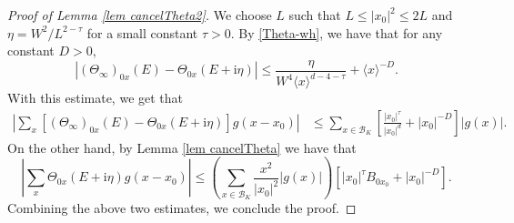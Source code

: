 \documentclass{article}
\newcommand{\1}{\mathds{1}}
\numberwithin{equation}{section}
\newcommand{\be}{\begin{equation}}
\newcommand{\ee}{\end{equation}}
\renewcommand{\cal}{\mathcal}
\newcommand{\ii}{\mathrm{i}} %
\renewcommand{\leq}{\leqslant}
\renewcommand{\le}{\leq}
\theoremstyle{plain} %
\theoremstyle{remark}
\begin{document}
\begin{proof}[Proof of Lemma \ref{lem cancelTheta2}]
 We choose $L$ such that $L\le |x_0|^2 \le 2L$ and $\eta=  W^{2}/L^{2-\tau}$ for a small constant $\tau>0$. By \eqref{Theta-wh}, we have that for any constant $D>0$, 
\be \nonumber %
  |(\Theta_\infty)_{0x}(E)-\Theta_{0x}(E+\ii\eta)|\le \frac{\eta }{W^4\langle x\rangle^{d-4-\tau}}+ \langle x \rangle^{-D} .
\ee
With this estimate, we get that 
\begin{align*}
\left|\sum_{x}\left[(\Theta_\infty)_{0 x}(E)-\Theta_{0x}(E+\ii \eta) \right]g(x-x_0)\right| &\le   \sum_{x\in \cal B_K}\left[ \frac{ |x_0|^\tau}{ |x_0|^{d}}+ |x_0|^{-D} \right] |g(x)|.
\end{align*}
On the other hand, %
by Lemma \ref{lem cancelTheta} we have that
$$\left|\sum_{x}\Theta_{0 x}(E+\ii \eta) g(x-x_0)\right| \le \left(\sum_{x\in \cal B_K}\frac{x^2}{|x_0|^2}|g(x)|\right) \left[  | x_0|^\tau B_{0x_0}    +  |x_0|^{-D} \right].$$
Combining the above two estimates, we conclude the proof.
\end{proof}
\end{document}
